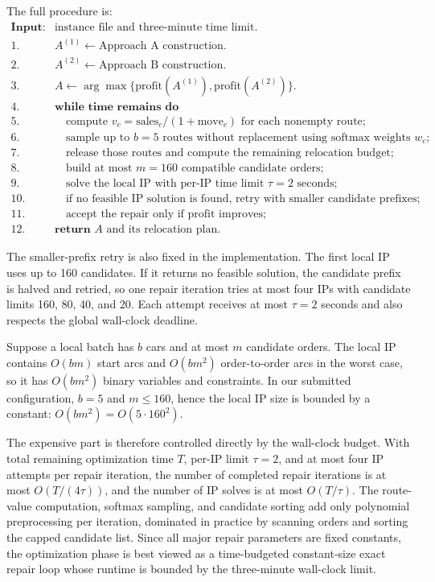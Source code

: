 \documentclass[10pt,a4paper]{article}
\begin{document}
The full procedure is:
\[
\begin{array}{ll}
\textbf{Input:} & \text{instance file and three-minute time limit}.\\
1. & A^{(1)}\leftarrow\text{Approach A construction}.\\
2. & A^{(2)}\leftarrow\text{Approach B construction}.\\
3. & A\leftarrow\arg\max\{\text{profit}(A^{(1)}),\text{profit}(A^{(2)})\}.\\
4. & \textbf{while time remains do}\\
5. & \quad \text{compute }v_c=\text{sales}_c/(1+\text{move}_c)\text{ for each nonempty route};\\
6. & \quad \text{sample up to }b=5\text{ routes without replacement using softmax weights }w_c;\\
7. & \quad \text{release those routes and compute the remaining relocation budget};\\
8. & \quad \text{build at most }m=160\text{ compatible candidate orders};\\
9. & \quad \text{solve the local IP with per-IP time limit }\tau=2\text{ seconds};\\
10. & \quad \text{if no feasible IP solution is found, retry with smaller candidate prefixes};\\
11. & \quad \text{accept the repair only if profit improves};\\
12. & \textbf{return } A \text{ and its relocation plan.}
\end{array}
\]

The smaller-prefix retry is also fixed in the implementation.  The first local
IP uses up to 160 candidates.  If it returns no feasible solution, the candidate
prefix is halved and retried, so one repair iteration tries at most four IPs
with candidate limits 160, 80, 40, and 20.  Each attempt receives at most
$\tau=2$ seconds and also respects the global wall-clock deadline.

Suppose a local batch has $b$ cars and at most $m$ candidate orders.  The local
IP contains $O(bm)$ start arcs and $O(bm^2)$ order-to-order arcs in the worst
case, so it has $O(bm^2)$ binary variables and constraints.  In our submitted
configuration, $b=5$ and $m\le160$, hence the local IP size is bounded by a
constant: $O(bm^2)=O(5\cdot160^2).$ 

The expensive part is therefore controlled directly by the wall-clock budget.
With total remaining optimization time $T$, per-IP limit $\tau=2$, and at most
four IP attempts per repair iteration, the number of completed repair iterations
is at most $O(T/(4\tau))$, and the number of IP solves is at most $O(T/\tau)$.
The route-value computation, softmax sampling, and candidate sorting add only
polynomial preprocessing per iteration, dominated in practice by scanning orders
and sorting the capped candidate list.  Since all major repair parameters are
fixed constants, the optimization phase is best viewed as a time-budgeted
constant-size exact repair loop whose runtime is bounded by the three-minute
wall-clock limit.
\end{document}
